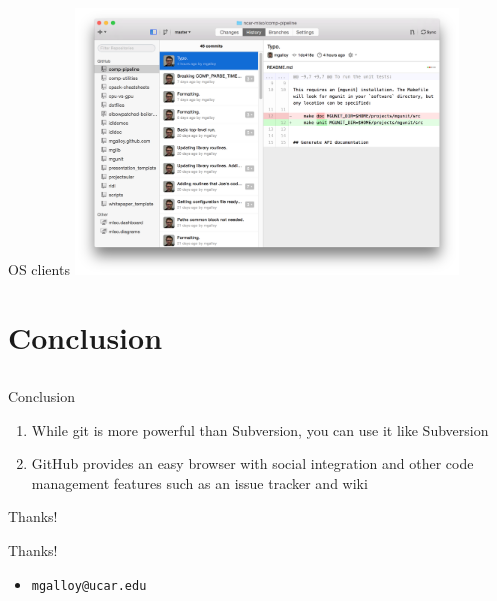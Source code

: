 \documentclass{beamer}
\begin{document}
\begin{frame}{OS clients}
  \includegraphics[width=4in]{mac-client.png}
\end{frame}


\section{Conclusion}
\subsection*{}

\begin{frame}{Conclusion}
  \begin{enumerate}
    \item While git is more powerful than Subversion, you can use it like Subversion
    \item GitHub provides an easy browser with social integration and other code management features such as an issue tracker and wiki
  \end{enumerate}
\end{frame}

\begin{frame}{Thanks!}
  \begin{center}{\huge Thanks!}\end{center}
  \begin{itemize}
    \item {\tt mgalloy@ucar.edu}
  \end{itemize}
\end{frame}
\end{document}
